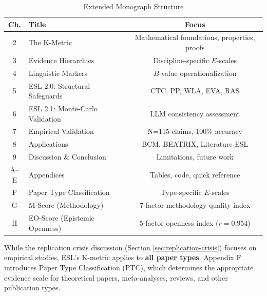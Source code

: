 \documentclass[11pt,a4paper]{article}
\begin{document}
\begin{table}[h]
\centering
\caption{Extended Monograph Structure}
\label{tab:roadmap}
\begin{tabular}{clc}
\toprule
\textbf{Ch.} & \textbf{Title} & \textbf{Focus} \\
\midrule
2 & The K-Metric & Mathematical foundations, properties, proofs \\
3 & Evidence Hierarchies & Discipline-specific $E$-scales \\
4 & Linguistic Markers & $B$-value operationalization \\
5 & ESL 2.0: Structural Safeguards & CTC, PP, WLA, EVA, RAS \\
6 & ESL 2.1: Monte-Carlo Validation & LLM consistency assessment \\
7 & Empirical Validation & N=115 claims, 100\% accuracy \\
8 & Applications & BCM, BEATRIX, Literature ESL \\
9 & Discussion \& Conclusion & Limitations, future work \\
A--E & Appendices & Tables, code, quick reference \\
F & Paper Type Classification & Type-specific $E$-scales \\
G & M-Score (Methodology) & 7-factor methodology quality index \\
H & EO-Score (Epistemic Openness) & 5-factor openness index ($r = 0.954$) \\
\bottomrule
\end{tabular}
\end{table}

\begin{warningbox}[title={Scope Note}]
While the replication crisis discussion (Section \ref{sec:replication-crisis}) focuses on empirical studies, ESL's K-metric applies to \textbf{all paper types}. Appendix F introduces Paper Type Classification (PTC), which determines the appropriate evidence scale for theoretical papers, meta-analyses, reviews, and other publication types.
\end{warningbox}


\newpage

\end{document}
